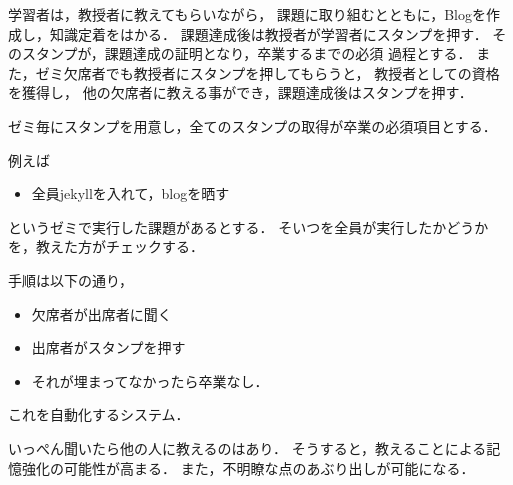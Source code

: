 \documentclass[a4,p11]{article}
\begin{document}
学習者は，教授者に教えてもらいながら，
課題に取り組むとともに，Blogを作成し，知識定着をはかる．
課題達成後は教授者が学習者にスタンプを押す．
そのスタンプが，課題達成の証明となり，卒業するまでの必須
過程とする．
また，ゼミ欠席者でも教授者にスタンプを押してもらうと，
教授者としての資格を獲得し，
他の欠席者に教える事ができ，課題達成後はスタンプを押す．

ゼミ毎にスタンプを用意し，全てのスタンプの取得が卒業の必須項目とする．

例えば
\begin{itemize}
\item 全員jekyllを入れて，blogを晒す
\end{itemize}
というゼミで実行した課題があるとする．
そいつを全員が実行したかどうかを，教えた方がチェックする．

手順は以下の通り，
\begin{itemize}
\item 欠席者が出席者に聞く
\item 出席者がスタンプを押す
\item それが埋まってなかったら卒業なし．
\end{itemize}
これを自動化するシステム．

いっぺん聞いたら他の人に教えるのはあり．
そうすると，教えることによる記憶強化の可能性が高まる．
また，不明瞭な点のあぶり出しが可能になる．
\end{document}
